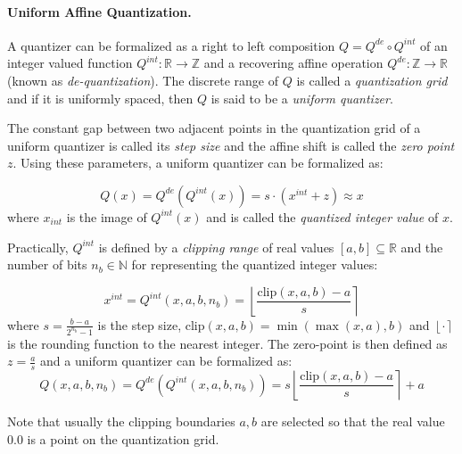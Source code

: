 \documentclass{article}
\newcommand{\brackets}[1]{\left(#1\right)}
\newcommand{\round}[1]{\left\lfloor#1\right\rceil}
\newcommand{\clip}[3]{\mathrm{clip}\left(#1,#2,#3\right)}
\begin{document}
\paragraph{Uniform Affine Quantization.}



A quantizer can be formalized as a right to left composition $Q=Q^{de} \circ Q^{int}$ of an integer valued function $Q^{int}: \mathbb{R} \rightarrow \mathbb{Z}$ and a recovering affine operation $Q^{de}: \mathbb{Z} \rightarrow\mathbb{R}$ (known as \textit{de-quantization}). The discrete range of $Q$ is called a \textit{quantization grid} and if it is uniformly spaced, then $Q$ is said to be a \textit{uniform quantizer}. 

The constant gap between two adjacent points in the quantization grid of a uniform quantizer is called its \textit{step size} and the affine shift is called the \textit{zero point} $z$. 
Using these parameters, a uniform quantizer can be formalized as:

\begin{equation} 
    Q(x)=Q^{de}(Q^{int}(x))=s \cdot \brackets{x^{int}+z}  \approx x
 \label{eq:q_de}
\end{equation}
 where $x_{int}$ is the image of $Q^{int}(x)$ and is called the \textit{quantized integer value} of $x$.
 
Practically, $Q^{int}$ is defined by a \textit{clipping range} of real values $[a,b] \subseteq\mathbb{R}$ and the number of bits $n_b\in\mathbb{N}$ for representing the quantized integer values:

\begin{equation}
x^{int}=Q^{int}\brackets{x,a,b,n_b}=\round{\frac{\clip{x}{a}{b}-a}{s}}
\end{equation}
where $s=\frac{b-a}{2^{n_b}-1}$ is the step size, $\clip{x}{a}{b} = \min(\max(x,a), b)$ and $\round{\cdot}$ is the rounding function to the nearest integer. The zero-point is then defined as $z=\frac{a}{s}$ and a uniform quantizer can be formalized as:
\begin{equation}
    Q\brackets{x,a,b,n_b}=Q^{de}\brackets{Q^{int}\brackets{x,a,b,n_b}}=s\round{\frac{\clip{x}{a}{b}-a}{s}}+a
\label{eq:uniform_quantizer}    \end{equation}



Note that usually the clipping boundaries $a,b$ are selected so that the real value 0.0 is a point on the quantization grid. 
\end{document}
